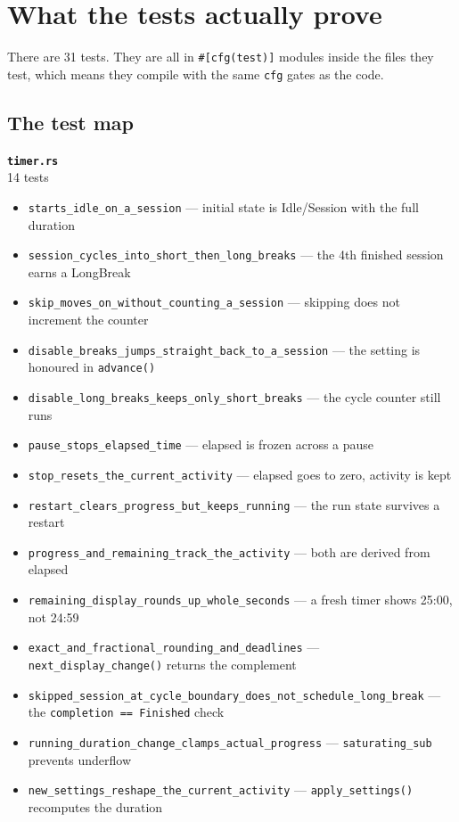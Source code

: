 \clearpage
\section{What the tests actually prove}

There are 31 tests. They are all in \texttt{\#[cfg(test)]} modules inside the files they
test, which means they compile with the same \texttt{cfg} gates as the code.

\subsection{The test map}

\noindent\textbf{\textcolor{pastel!45!black}{\texttt{timer.rs}}}\\[0.4em]
\hspace{1.4em}14 tests\par
\begin{itemize}[leftmargin=1.4em,itemsep=0.15em,topsep=0.1em]
\item \texttt{starts\_idle\_\allowbreak on\_a\_session} --- initial state is Idle/Session with the full duration
\item \texttt{session\_cycles\_\allowbreak into\_short\_then\_long\_breaks} --- the 4th finished session earns a LongBreak
\item \texttt{skip\_moves\_\allowbreak on\_without\_counting\_a\_session} --- skipping does not increment the counter
\item \texttt{disable\_breaks\_\allowbreak jumps\_straight\_back\_to\_a\_session} --- the setting is honoured in \texttt{advance()}
\item \texttt{disable\_long\_breaks\_\allowbreak keeps\_only\_short\_breaks} --- the cycle counter still runs
\item \texttt{pause\_stops\_\allowbreak elapsed\_time} --- elapsed is frozen across a pause
\item \texttt{stop\_resets\_\allowbreak the\_current\_activity} --- elapsed goes to zero, activity is kept
\item \texttt{restart\_clears\_\allowbreak progress\_but\_keeps\_running} --- the run state survives a restart
\item \texttt{progress\_and\_\allowbreak remaining\_track\_the\_activity} --- both are derived from elapsed
\item \texttt{remaining\_display\_\allowbreak rounds\_up\_whole\_seconds} --- a fresh timer shows 25:00, not 24:59
\item \texttt{exact\_and\_\allowbreak fractional\_rounding\_and\_deadlines} --- \texttt{next\_display\_change()} returns the complement
\item \texttt{skipped\_session\_at\_cycle\_boundary\_\allowbreak does\_not\_\allowbreak schedule\_long\_break} --- the \texttt{completion == Finished} check
\item \texttt{running\_duration\_change\_\allowbreak clamps\_actual\_progress} --- \texttt{saturating\_sub} prevents underflow
\item \texttt{new\_settings\_\allowbreak reshape\_the\_current\_activity} --- \texttt{apply\_settings()} recomputes the duration
\end{itemize}

